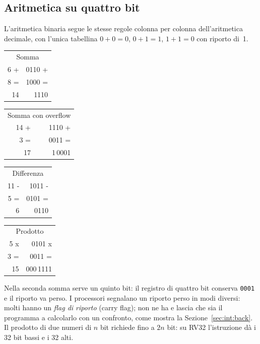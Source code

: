 \subsection{Aritmetica su quattro bit}

L'aritmetica binaria segue le stesse regole colonna per colonna
dell'aritmetica decimale, con l'unica tabellina $0+0=0$, $0+1=1$, $1+1=0$ con
riporto di~1.

\begin{center}\ttfamily
\begin{tabular}{@{}r@{\quad}r@{}}
\multicolumn{2}{c}{\textsf{\small Somma}}\\
6 + & 0110 +\\ 8 = & 1000 =\\\hline 14 & 1110
\end{tabular}\qquad
\begin{tabular}{@{}r@{\quad}r@{}}
\multicolumn{2}{c}{\textsf{\small Somma con overflow}}\\
14 + & 1110 +\\ 3 = & 0011 =\\\hline 17 & \textcolor{prgred}{1}\,0001
\end{tabular}\qquad
\begin{tabular}{@{}r@{\quad}r@{}}
\multicolumn{2}{c}{\textsf{\small Differenza}}\\
11 - & 1011 -\\ 5 = & 0101 =\\\hline 6 & 0110
\end{tabular}\qquad
\begin{tabular}{@{}r@{\quad}r@{}}
\multicolumn{2}{c}{\textsf{\small Prodotto}}\\
5 x & 0101 x\\ 3 = & 0011 =\\\hline 15 & 000\,1111
\end{tabular}
\end{center}

Nella seconda somma serve un quinto bit: il registro di quattro bit conserva
\texttt{0001} e il riporto va perso. I processori segnalano un riporto perso in
modi diversi: molti hanno un \emph{flag di riporto} (carry flag); \riscv non ne
ha e lascia che sia il programma a calcolarlo con un confronto, come mostra la
Sezione~\ref{sec:int:back}. Il prodotto di due numeri di $n$ bit richiede fino
a $2n$ bit: su RV32 l'istruzione  dà i 32 bit bassi e  i 32
alti.

